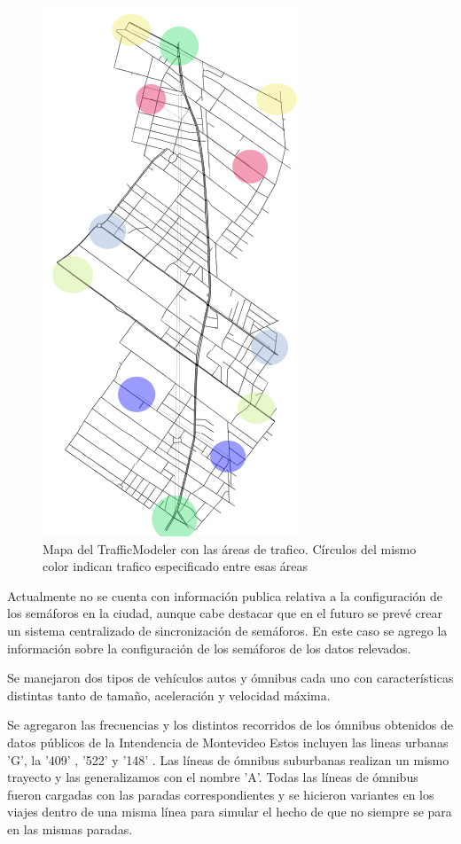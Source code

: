\begin{figure}[H]
\centering
\includegraphics[width=0.4\linewidth]{Figures/areaflow1}
\caption{Mapa del TrafficModeler con las áreas de trafico. Círculos del mismo color indican trafico especificado entre esas áreas}
\label{fig:areaflow1}
\end{figure}


Actualmente no se cuenta con información publica relativa a la configuración de los semáforos en la ciudad, aunque cabe destacar que en el futuro se prevé crear un sistema centralizado de sincronización de semáforos. \citep{OBS01} 
En este caso se agrego la información sobre la configuración de los semáforos de los datos relevados.

Se manejaron dos tipos de vehículos autos y ómnibus cada uno con características distintas tanto de tamaño, aceleración y velocidad máxima.

Se agregaron las frecuencias y los distintos recorridos de los ómnibus obtenidos de datos públicos de la Intendencia de Montevideo \citep{IMM}
Estos incluyen las lineas urbanas  'G',  la  '409' , '522'  y  '148' . Las líneas de ómnibus suburbanas realizan  un mismo  trayecto y las generalizamos con el nombre 'A'.  
Todas  las  líneas  de  ómnibus
fueron cargadas con las paradas correspondientes y se
hicieron  variantes  en  los  viajes  dentro  de  una  misma
línea para simular el hecho de que no siempre se para en las mismas paradas.




